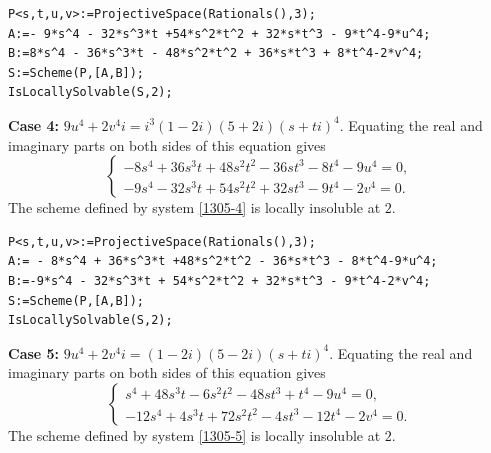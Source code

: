 \documentclass[a4paper,12pt,english,reqno]{amsart}
\begin{document}
\begin{lstlisting}
P<s,t,u,v>:=ProjectiveSpace(Rationals(),3);
A:=- 9*s^4 - 32*s^3*t +54*s^2*t^2 + 32*s*t^3 - 9*t^4-9*u^4;
B:=8*s^4 - 36*s^3*t - 48*s^2*t^2 + 36*s*t^3 + 8*t^4-2*v^4;
S:=Scheme(P,[A,B]);
IsLocallySolvable(S,2);
\end{lstlisting}

{\bf Case 4:} $9u^4+2v^4i=i^3(1-2i)(5+2i)(s+ti)^4$. Equating the real and imaginary parts on both sides of this equation gives
\begin{equation}\label{1305-4}
\begin{cases}
-8s^4 + 36s^3t + 48s^2t^2 - 36st^3 - 8t^4 - 9u^4=0,\\
-9s^4 - 32s^3t + 54s^2t^2 + 32st^3 - 9t^4 - 2v^4=0.
\end{cases}
\end{equation}
The scheme defined by system \eqref{1305-4} is locally insoluble at $2$.



\begin{lstlisting}
P<s,t,u,v>:=ProjectiveSpace(Rationals(),3);
A:= - 8*s^4 + 36*s^3*t +48*s^2*t^2 - 36*s*t^3 - 8*t^4-9*u^4;
B:=-9*s^4 - 32*s^3*t + 54*s^2*t^2 + 32*s*t^3 - 9*t^4-2*v^4;
S:=Scheme(P,[A,B]);
IsLocallySolvable(S,2);
\end{lstlisting}

{\bf Case 5:} $9u^4+2v^4i=(1-2i)(5-2i)(s+ti)^4$. Equating the real and imaginary parts on both sides of this equation gives
\begin{equation}\label{1305-5}
\begin{cases}
s^4 + 48s^3t - 6s^2t^2 - 48st^3 + t^4 - 9u^4=0,\\
-12s^4 + 4s^3t + 72s^2t^2 - 4st^3 - 12t^4 - 2v^4=0.
\end{cases}
\end{equation}
The scheme defined by system \eqref{1305-5} is locally insoluble at $2$.

\end{document}
